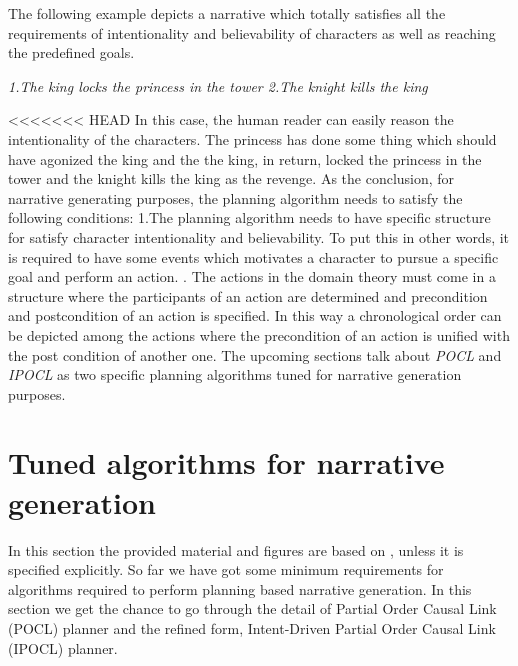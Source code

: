 \documentclass[english]{tktltiki}
\begin{document}
The following example depicts a narrative which totally satisfies all the requirements of intentionality and believability of characters as well as reaching the predefined goals.
\begin{flushleft}
\textit{1.The king locks the princess in the tower \newline 2.The knight kills the king}
\end{flushleft} 
<<<<<<< HEAD
In this case, the human reader can easily reason the intentionality of the characters. The princess has done some thing which should have agonized the king and the the king, in return, locked the princess in the tower and the knight kills the king as the revenge. \newline
As the conclusion, for narrative generating purposes, the planning algorithm needs to satisfy the following conditions: \newline
1.The planning algorithm needs to have specific structure for satisfy character intentionality and believability. To put this in other words, it is required to have some events which motivates a character to pursue a specific goal and perform an action. . The actions in the domain theory must come in a structure where the participants of an action are determined and precondition and postcondition of an action is specified. In this way a chronological order can be depicted among the actions where the precondition of an action is unified with the post condition of another one.\newline
The upcoming sections talk about \textit{POCL} and \textit{IPOCL} as two specific planning algorithms tuned for narrative generation purposes.
\section{Tuned algorithms for narrative generation}
In this section the provided material and figures are based on \cite{planning:2010:NPB:1946417.1946422}, unless it is specified explicitly.
So far we have got some minimum requirements for algorithms required to perform planning based narrative generation. In this section we get the chance to go through the detail of Partial Order Causal Link (POCL) planner and the refined form, Intent-Driven Partial Order Causal Link (IPOCL) planner.
\end{document}
